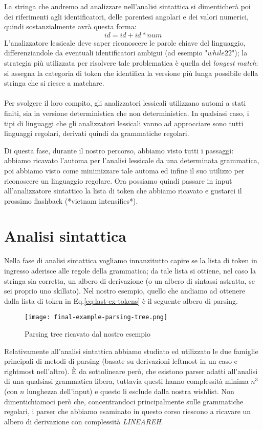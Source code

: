 \documentclass[class=book, crop=false, oneside, 12pt]{standalone}
\begin{document}
La stringa che andremo ad analizzare nell'analisi sintattica si dimenticherà poi dei riferimenti agli identificatori, delle parentesi angolari e dei valori numerici, quindi sostanzialmente avrà questa forma:
\begin{equation}
    id = id + id * num
\end{equation}
L'analizzatore lessicale deve saper riconoscere le parole chiave del linguaggio, differenziandole da eventuali identificatori ambigui (ad esempio "\(while22\)"); la strategia più utilizzata per risolvere tale problematica è quella del \emph{longest match}: si assegna la categoria di token che identifica la versione più lunga possibile della stringa che si riesce a matchare.
\\\\
Per svolgere il loro compito, gli analizzatori lessicali utilizzano automi a stati finiti, sia in versione deterministica che non deterministica.
In qualsiasi caso, i tipi di linguaggi che gli analizzatori lessicali vanno ad approcciare sono tutti linguaggi regolari, derivati quindi da grammatiche regolari.

Di questa fase, durante il nostro percorso, abbiamo visto tutti i passaggi: abbiamo ricavato l'automa per l'analisi lessicale da una determinata grammatica, poi abbiamo visto come minimizzare tale automa ed infine il suo utilizzo per riconoscere un linguaggio regolare.
Ora possiamo quindi passare in input all'analizzatore sintattico la lista di token che abbiamo ricavato e gustarci il prossimo flashback (*vietnam intensifies*). 

\section{Analisi sintattica}
Nella fase di analisi sintattica vogliamo innanzitutto capire se la lista di token in ingresso aderisce alle regole della grammatica; da tale lista si ottiene, nel caso la stringa sia corretta, un albero di derivazione (o un albero di sintassi astratta, se sei proprio uno skillato).
Nel nostro esempio, quello che andiamo ad ottenere dalla lista di token in Eq.\ref{eq:last-ex-tokens} è il seguente albero di parsing.
\begin{figure}[H]
    \centering
    \texttt{[image: final-example-parsing-tree.png]}
    \caption{Parsing tree ricavato dal nostro esempio}
    \label{fig:last-ex-parse-tree}
\end{figure}
Relativamente all'analisi sintattica abbiamo studiato ed utilizzato le due famiglie principali di metodi di parsing (basate su derivazioni leftmost in un caso e rightmost nell'altro). 
È da sottolineare però, che esistono parser adatti all'analisi di una qualsiasi grammatica libera, tuttavia questi hanno complessità minima \(n^3\) (con \(n\) lunghezza dell'input) e questo li esclude dalla nostra wishlist.
Non dimentichiamoci però che, concentrandoci principalmente sulle grammatiche regolari, i parser che abbiamo esaminato in questo corso riescono a ricavare un albero di derivazione con complessità \emph{LINEAREH}.
\end{document}
